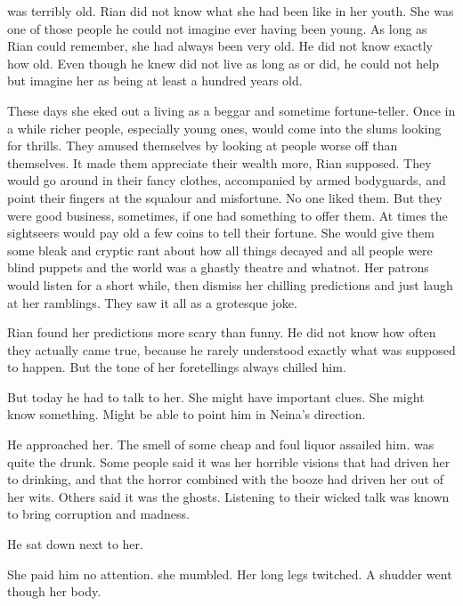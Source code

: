 \Uswa{} was terribly old. 
Rian did not know what she had been like in her youth. 
She was one of those people he could not imagine ever having been young. 
As long as Rian could remember, she had always been very old. 
He did not know exactly how old. 
Even though he knew \meccara{} did not live as long as \humans{} or \scathae{} did, he could not help but imagine her as being at least a hundred years old. 

These days she eked out a living as a beggar and sometime fortune-teller. 
Once in a while richer people, especially young ones, would come into the slums looking for thrills. 
They amused themselves by looking at people worse off than themselves. 
It made them appreciate their wealth more, Rian supposed. 
They would go around in their fancy clothes, accompanied by armed bodyguards, and point their fingers at the squalour and misfortune. 
No one liked them. 
But they were good business, sometimes, if one had something to offer them. 
At times the sightseers would pay old \Uswa{} a few coins to tell their fortune. 
She would give them some bleak and cryptic rant about how all things decayed and all people were blind puppets and the world was a ghastly theatre and whatnot. 
Her patrons would listen for a short while, then dismiss her chilling predictions and just laugh at her ramblings. 
They saw it all as a grotesque joke. 

Rian found her predictions more scary than funny. 
He did not know how often they actually came true, because he rarely understood exactly what was supposed to happen. 
But the tone of her foretellings always chilled him. 

But today he had to talk to her. 
She might have important clues. 
She might know something.
Might be able to point him in Neina's direction. 

He approached her. 
The smell of some cheap and foul liquor assailed him. 
\Uswa{} was quite the drunk. 
Some people said it was her horrible visions that had driven her to drinking, and that the horror combined with the booze had driven her out of her wits. 
Others said it was the ghosts. 
Listening to their wicked talk was known to bring corruption and madness. 

He sat down next to her. 

\begin{comment}
\subsection{Her prophecy}
\end{comment}
She paid him no attention. 
 she mumbled. 
Her long legs twitched. 
A shudder went though her body. 

